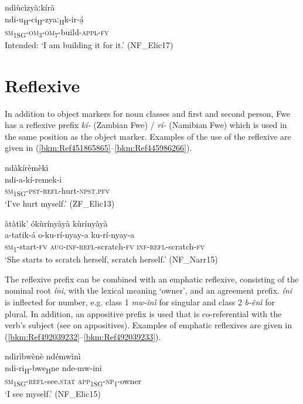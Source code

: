 \ea
\label{bkm:Ref74907374}
\glll *ndìùcìzyàːkírà\\
ndi-u\textsubscript{H}-ci\textsubscript{H}-zyaː\textsubscript{H}k-ir-á̲\\
\textsc{sm}\textsubscript{1SG}-\textsc{om}\textsubscript{3}-\textsc{om}\textsubscript{7}-build-\textsc{appl}-\textsc{fv}\\
\glt Intended: ‘I am building it for it.’ (NF\_Elic17)
\z
\section{Reflexive}
\label{bkm:Ref451256199}\hypertarget{Toc75352675}{}
In addition to object markers for noun classes and first and second person, Fwe has a reflexive prefix \textit{kí-} (Zambian Fwe) / \textit{rí-} (Namibian Fwe) which is used in the same position as the object marker. Examples of the use of the reflexive are given in (\ref{bkm:Ref451865865}--\ref{bkm:Ref445986266}).

\ea
\label{bkm:Ref451865865}
\glll ndàkírèmèkì\\
ndi-a-kí-remek-i\\
\textsc{sm}\textsubscript{1SG}-\textsc{pst}-\textsc{refl}-hurt-\textsc{npst}.\textsc{pfv}\\
\glt ‘I’ve hurt myself.’ (ZF\_Elic13)
\z

\ea
\label{bkm:Ref445986266}
àtàtìk’ ókùrínyàyà kùrínyàyà\\
\gll a-tatik-á  o-ku-rí-nyay-a    ku-rí-nyay-a\\
\textsc{sm}\textsubscript{1}-start-\textsc{fv}  \textsc{aug}-\textsc{inf}-\textsc{refl}-scratch-\textsc{fv}  \textsc{inf}-\textsc{refl}-scratch-\textsc{fv}\\
\glt ‘She starts to scratch herself, scratch herself.’ (NF\_Narr15)
\z

The reflexive prefix can be combined with an emphatic reflexive, consisting of the nominal root \textit{íni}, with the lexical meaning ‘owner’, and an agreement prefix. \textit{íni} is inflected for number, e.g. class 1 \textit{mw-înì} for singular and class 2 \textit{b-ênì} for plural. In addition, an appositive prefix is used that is co-referential with the verb’s subject (see  on appositives). Examples of emphatic reflexives are given in (\ref{bkm:Ref492039232}--\ref{bkm:Ref492039233}).

\ea
\label{bkm:Ref492039232}
ndìrìbwènè ndémwìnì\\
\gll ndi-ri\textsubscript{H}-bwe\textsubscript{H}ne    nde-mw-ini\\
\textsc{sm}\textsubscript{1SG}-\textsc{refl}-see.\textsc{stat}    \textsc{app}\textsubscript{1SG}-\textsc{np}\textsubscript{1}-owner\\
\glt ‘I see myself.’ (NF\_Elic15)
\z

